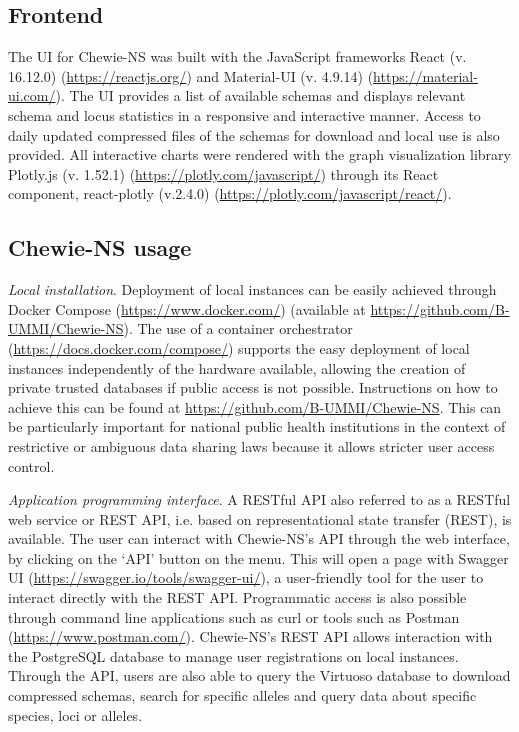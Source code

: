 \subsection{Frontend} \label{ssec:ch3_database_creation_frontend}

The \ac{UI} for \ac{Chewie-NS} was built with the JavaScript frameworks React (v. 16.12.0) (\url{https://reactjs.org/}) and Material-UI (v. 4.9.14) (\url{https://material-ui.com/}). The \ac{UI} provides a list of available schemas and displays relevant schema and locus statistics in a responsive and interactive manner. Access to daily updated compressed files of the schemas for download and local use is also provided. All interactive charts were rendered with the graph visualization library Plotly.js (v. 1.52.1) (\url{https://plotly.com/javascript/}) through its React component, react-plotly (v.2.4.0) (\url{https://plotly.com/javascript/react/}).

\subsection{Chewie-NS usage} \label{ssec:ch3_database_creation_usage}

\textit{Local installation}. Deployment of local instances can be easily achieved through Docker Compose (\url{https://www.docker.com/}) (available at \url{https://github.com/B-UMMI/Chewie-NS}). The use of a container orchestrator (\url{https://docs.docker.com/compose/}) supports the easy deployment of local instances independently of the hardware available, allowing the creation of private trusted databases if public access is not possible. Instructions on how to achieve this can be found at \url{https://github.com/B-UMMI/Chewie-NS}. This can be particularly important for national public health institutions in the context of restrictive or ambiguous data sharing laws because it allows stricter user access control.

\textit{Application programming interface}. A \ac{REST}ful \ac{API} also referred to as a \ac{REST}ful web service or \ac{REST} \ac{API}, i.e. based on representational state transfer (REST), is available. The user can interact with \ac{Chewie-NS}’s \ac{API} through the web interface, by clicking on the ‘API’ button on the menu. This will open a page with Swagger \ac{UI} (\url{https://swagger.io/tools/swagger-ui/}), a user-friendly tool for the user to interact directly with the \ac{REST} \ac{API}. Programmatic access is also possible through command line applications such as curl or tools such as Postman (\url{https://www.postman.com/}). \ac{Chewie-NS}’s \ac{REST} \ac{API} allows interaction with the PostgreSQL database to manage user registrations on local instances. Through the \ac{API}, users are also able to query the Virtuoso database to download compressed schemas, search for specific alleles and query data about specific species, loci or alleles.

